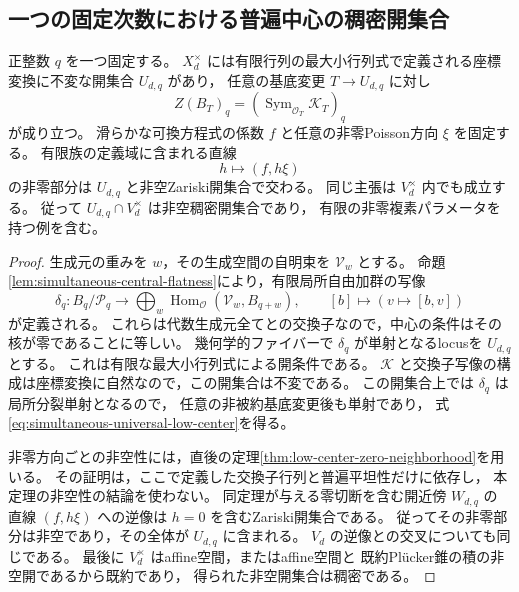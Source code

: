\subsection{一つの固定次数における普遍中心の稠密開集合}

\begin{theorem}\label{thm:finite-low-center-open}
正整数 $q$ を一つ固定する。
$X_d^\times$ には有限行列の最大小行列式で定義される座標変換に不変な開集合 $U_{d,q}$ があり，
任意の基底変更 $T\to U_{d,q}$ に対し
\begin{equation}\label{eq:simultaneous-universal-low-center}
 Z(B_T)_q=(\operatorname{Sym}_{\mathcal O_T}\mathcal K_T)_q
\end{equation}
が成り立つ。
滑らかな可換方程式の係数 $f$ と任意の非零Poisson方向 $\xi$ を固定する。
有限族の定義域に含まれる直線
\[
 h\longmapsto(f,h\xi)
\]
の非零部分は $U_{d,q}$ と非空Zariski開集合で交わる。
同じ主張は $V_d^\times$ 内でも成立する。
従って $U_{d,q}\cap V_d^\times$ は非空稠密開集合であり，
有限の非零複素パラメータを持つ例を含む。
\end{theorem}
\begin{proof}
生成元の重みを $w$，その生成空間の自明束を $\mathcal V_w$ とする。
命題\ref{lem:simultaneous-central-flatness}により，有限局所自由加群の写像
\begin{equation}\label{eq:simultaneous-low-center-matrix}
 \delta_q:B_q/\mathcal P_q\longrightarrow
       \bigoplus_w\operatorname{Hom}_{\mathcal O}
          (\mathcal V_w,B_{q+w}),
 \qquad [b]\longmapsto(v\mapsto[b,v])
\end{equation}
が定義される。
これらは代数生成元全てとの交換子なので，中心の条件はその核が零であることに等しい。
幾何学的ファイバーで $\delta_q$ が単射となるlocusを $U_{d,q}$ とする。
これは有限な最大小行列式による開条件である。
$\mathcal K$ と交換子写像の構成は座標変換に自然なので，この開集合は不変である。
この開集合上では $\delta_q$ は局所分裂単射となるので，
任意の非被約基底変更後も単射であり，
式\eqref{eq:simultaneous-universal-low-center}を得る。

非零方向ごとの非空性には，直後の定理\ref{thm:low-center-zero-neighborhood}を用いる。
その証明は，ここで定義した交換子行列と普遍平坦性だけに依存し，
本定理の非空性の結論を使わない。
同定理が与える零切断を含む開近傍 $W_{d,q}$ の
直線 $(f,h\xi)$ への逆像は $h=0$ を含むZariski開集合である。
従ってその非零部分は非空であり，その全体が $U_{d,q}$ に含まれる。
$V_d$ の逆像との交叉についても同じである。
最後に $V_d^\times$ はaffine空間，またはaffine空間と
既約Pl\"ucker錐の積の非空開であるから既約であり，
得られた非空開集合は稠密である。
\end{proof}

